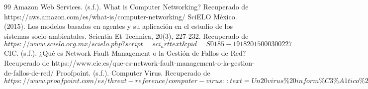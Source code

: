 \documentclass[12pt]{article}
\begin{document}
\begin{thebibliography}{99}
    Amazon Web Services. (s.f.). What is Computer Networking? Recuperado de https://aws.amazon.com/es/what-is/computer-networking/
    SciELO México. (2015). Los modelos basados en agentes y su aplicación en el estudio de los sistemas socio-ambientales. Scientia Et Technica, 20(3), 227-232. Recuperado de $https://www.scielo.org.mx/scielo.php?script=sci_arttext\&pid=S0185-19182015000300227$
    CIC. (s.f.). ¿Qué es Network Fault Management o la Gestión de Fallos de Red? Recuperado de https://www.cic.es/que-es-network-fault-management-o-la-gestion-de-fallos-de-red/
    Proofpoint. (s.f.). Computer Virus. Recuperado de $https://www.proofpoint.com/es/threat-reference/computer-virus:~:text=Un20virus\%20inform\%C3\%A1tico\%20es\%20una,un\%20dispositivo\%20o\%20red\%20local.$
\end{thebibliography}
\end{document}
